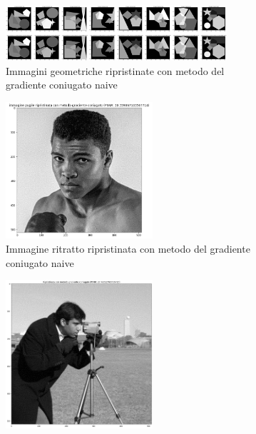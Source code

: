 \begin{figure}[H]
  \centering
  \begin{subfigure}{0.9\textwidth}
    \centering
    \includegraphics[width=0.9\textwidth]{imgRel/datasetconiugato.png}
    \caption{Immagini geometriche ripristinate con metodo del gradiente coniugato naive}
    \label{fig:geomripristinate}
  \end{subfigure}

  \begin{subfigure}{0.5\textwidth}
    \centering
    \includegraphics[width=0.6\textwidth]{imgRel/pugilemgc.png}
    \caption{Immagine ritratto ripristinata con metodo del gradiente coniugato naive}
    \label{fig:pugilemgc}
  \end{subfigure}\hfill
  \begin{subfigure}{0.5\textwidth}
    \centering
    \includegraphics[width=0.6\textwidth]{MANCANTI/cameramanPuntoDueCG.png}

\end{subfigure}
\end{figure}
